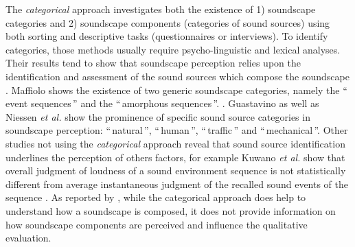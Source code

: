 \documentclass[twoside,twocolumn]{article}
\begin{document}
The \textit{categorical} approach investigates both the existence of 1) soundscape categories and 2) soundscape components (categories of sound sources) using both sorting \cite{maffiolo_caracterisation_1999, guastavino_categorization_2007} and descriptive \cite{axelsson2005soundscape, raimbault_urban_2005, raimbault2006qualitative, guastavino_ideal_2006} tasks (questionnaires or interviews). To identify categories, those methods usually require psycho-linguistic and lexical analyses. Their results tend to show that soundscape perception relies upon the identification and assessment of the sound sources which compose the soundscape \cite{dubois2006cognitive}. Maffiolo \cite{maffiolo_caracterisation_1999} shows the existence of two generic soundscape categories, namely the ``\,event sequences\,'' and the ``\,amorphous sequences\,''. . Guastavino \cite{guastavino_categorization_2007} as well as Niessen \emph{et al.} \cite{niessen_categories_2010}  show the prominence of specific sound source categories in soundscape perception: ``\,natural\,'', ``\,human\,'', ``\,traffic\,'' and ``\,mechanical\,''. Other studies not using  the \textit{categorical} approach reveal that sound source identification underlines the perception of others factors, for example Kuwano \emph{et al.} \cite{kuwano_memory_2003-1} show that overall judgment of loudness of a sound environment sequence is not statistically different from average instantaneous judgment of the recalled sound events of the sequence .  As reported by \cite{davies_perception_2013}, while the categorical approach does help to understand how a soundscape is composed, it does not provide information on how soundscape components are perceived and influence the qualitative evaluation.
\end{document}
